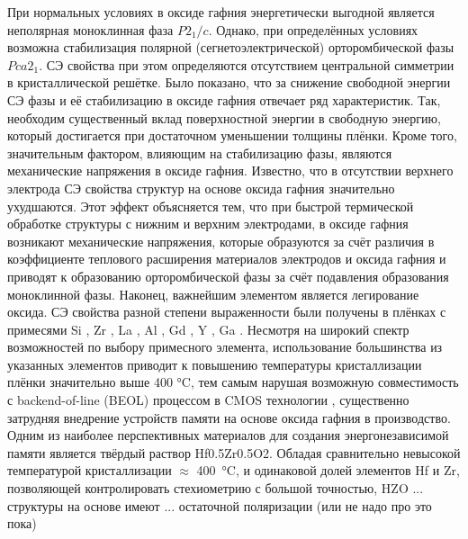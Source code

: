 При нормальных условиях в оксиде гафния энергетически выгодной является неполярная моноклинная фаза \(P2_1/c\). %
Однако, при определённых условиях возможна стабилизация полярной (сегнетоэлектрической) орторомбической фазы \(Pca2_1\). СЭ свойства при этом определяются отсутствием центральной симметрии в кристаллической решётке.
Было показано, что за снижение свободной энергии СЭ фазы и её стабилизацию в оксиде гафния отвечает ряд характеристик. Так, необходим существенный вклад поверхностной энергии в свободную энергию, который достигается при достаточном уменьшении толщины плёнки. Кроме того, значительным фактором, влияющим на стабилизацию фазы, являются механические напряжения в оксиде гафния. Известно, что в отсутствии верхнего электрода СЭ свойства структур на основе оксида гафния значительно ухудшаются. Этот эффект объясняется тем, что при быстрой термической обработке структуры с нижним и верхним электродами, в оксиде гафния возникают механические напряжения, которые образуются за счёт различия в коэффициенте теплового расширения материалов электродов и оксида гафния и приводят к образованию орторомбической фазы за счёт подавления образования моноклинной фазы. Наконец, важнейшим элементом является легирование оксида. СЭ свойства разной степени выраженности были получены в плёнках с примесями Si \cite{bosckeFerroelectricityHafniumOxide2011}, Zr \cite{bosckePhaseTransitionsFerroelectric2011}, La \cite{schroederLanthanumDopedHafniumOxide2018}, Al \cite{muellerIncipientFerroelectricityDoped2012}, Gd \cite{}, Y \cite{}, Ga \cite{chouprikNanoscaleDopingIts2022}. Несмотря на широкий спектр возможностей по выбору примесного элемента, использование большинства из указанных элементов приводит к повышению температуры кристаллизации плёнки значительно выше 400 \si{\degreeCelsius}, тем самым нарушая возможную совместимость с backend-of-line (BEOL) процессом в CMOS технологии \cite{schmitzLowTemperatureThin2018}, существенно затрудняя внедрение устройств памяти на основе оксида гафния в производство. Одним из наиболее перспективных материалов для создания энергонезависимой памяти является твёрдый раствор Hf0.5Zr0.5O2. Обладая сравнительно невысокой температурой кристаллизации \(\approx\) \SI{400}{\degreeCelsius}, и одинаковой долей элементов Hf и Zr, позволяющей контролировать стехиометрию с большой точностью, HZO ... структуры на основе имеют ... остаточной поляризации (или не надо про это пока)

